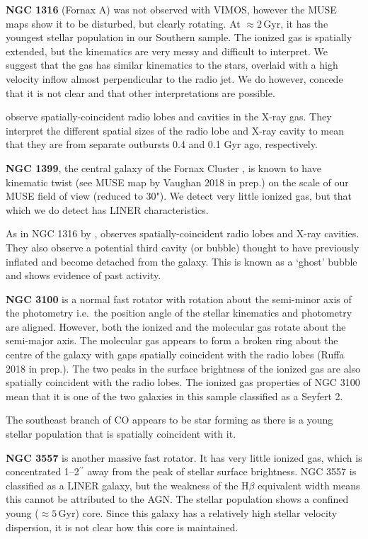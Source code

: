 \textbf{NGC 1316} (Fornax A) was not observed with VIMOS, however the MUSE maps show it to be disturbed, but clearly rotating. At $\approx 2$\,Gyr, it has the youngest stellar population in our Southern sample. The ionized gas is spatially extended, but the kinematics are very messy and difficult to interpret. We suggest that the gas has similar kinematics to the stars, overlaid with a high velocity inflow almost perpendicular to the radio jet. We do however, concede that it is not clear and that other interpretations are possible. 

\citet{Lanz2010} observe spatially-coincident radio lobes and cavities in the X-ray gas. They interpret the different spatial sizes of the radio lobe and X-ray cavity to mean that they are from separate outbursts 0.4 and 0.1 Gyr ago, respectively.

\textbf{NGC 1399}, the central galaxy of the Fornax Cluster \citep{Jordan2007}, is known to have kinematic twist (see MUSE map by Vaughan 2018 in prep.) on the scale of our MUSE field of view (reduced to 30"). We detect very little ionized gas, but that which we do detect has LINER characteristics. 

As in NGC 1316 by \citet{Lanz2010}, \citet{Su2017} observes spatially-coincident radio lobes and X-ray cavities. They also observe a potential third cavity (or bubble) thought to have previously inflated and become detached from the galaxy. This is known as a `ghost' bubble and shows evidence of past activity.

\textbf{NGC 3100} is a normal fast rotator with rotation about the semi-minor axis of the photometry i.e.\ the position angle of the stellar kinematics and photometry are aligned. However, both the ionized and the molecular gas rotate about the semi-major axis. The molecular gas appears to form a broken ring about the centre of the galaxy with gaps spatially coincident with the radio lobes (Ruffa 2018 in prep.). The two peaks in the surface brightness of the ionized gas are also spatially coincident with the radio lobes. The ionized gas properties of NGC 3100 mean that it is one of the two galaxies in this sample classified as a Seyfert 2. 

The southeast branch of CO appears to be star forming as there is a young stellar population that is spatially coincident with it.

\textbf{NGC 3557} is another massive fast rotator. It has very little ionized gas, which is concentrated 1--2$^{\prime\prime}$ away from the peak of stellar surface brightness. NGC 3557 is classified as a LINER galaxy, but the weakness of the H$\beta$ equivalent width means this cannot be attributed to the AGN. The stellar population shows a confined young ($\approx 5$\,Gyr) core. Since this galaxy has a relatively high stellar velocity dispersion, it is not clear how this core is maintained. 

